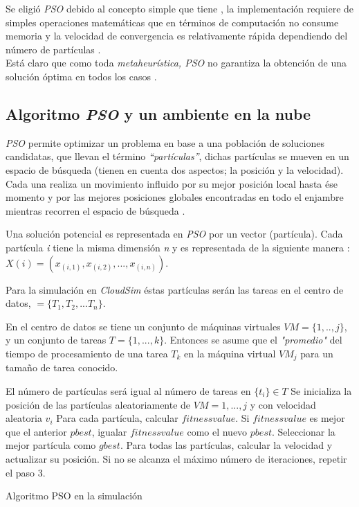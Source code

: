 \documentclass[jou,apacite]{apa6}
\begin{document}
Se eligió  \textit{PSO} debido al concepto simple que tiene \cite{poli2007},  la implementación requiere de simples operaciones matemáticas que en términos de computación no consume memoria  y la velocidad de convergencia es relativamente rápida dependiendo del número de partículas \cite{eberhart1995}.\\ 
Está claro que como toda \textit{metaheurística, PSO} no garantiza la obtención de una solución óptima en todos los casos \cite{osman2012}.

\subsection{Algoritmo \textit{PSO} y un ambiente en la nube}
\textit{PSO} permite optimizar un problema en base a una población de soluciones candidatas, que llevan el término \textit{“partículas”}, dichas partículas se mueven en un espacio de búsqueda (tienen en cuenta dos aspectos; la posición y la velocidad). Cada una realiza un movimiento influido por su mejor posición local hasta ése momento y por las mejores posiciones globales encontradas en todo el enjambre mientras recorren el espacio de búsqueda \cite{poli2007}.

Una solución potencial es representada en \textit{PSO} por un vector (partícula). Cada partícula \textit{i} tiene la misma dimensión \textit{n} y es representada de la siguiente manera \cite{pandey2010}: $X(i) = (x_{(i,1)},x_{(i,2)},...,x_{(i,n)})  $.

Para la simulación en \textit{CloudSim} éstas partículas serán las tareas en el centro de datos, $ = \{T_1 , T_2 , ... T_n\}  $.


En el centro de datos se tiene un conjunto de máquinas virtuales $VM = \{1,..,j\}$, y un conjunto de tareas $T = \{1,...,k\}$. Entonces se asume que el \textit{"promedio"} del tiempo de procesamiento de una tarea $T_k$ en la máquina virtual $VM_j$ para un tamaño de tarea conocido.
\newpage
\begin{algorithm} 
	\begin{algorithmic}[1]
		\State El número de partículas será igual al número de tareas en $ \{ t_i \} \in T $
		\State Se inicializa la posición de las partículas aleatoriamente de $VM = 1,...,j $ y con velocidad aleatoria $v_i$
		\State Para cada partícula, calcular $fitness value$.
		\State Si $fitness value$ es mejor que el anterior $pbest$, igualar $fitness value$ como el nuevo $pbest$.
		\State Seleccionar la mejor partícula como $gbest$.
		\State Para todas las partículas, calcular la velocidad y actualizar su posición.
		\State Si no se alcanza el máximo número de iteraciones, repetir el paso 3.
		
	\end{algorithmic} 
	\caption{Algoritmo PSO en la simulación}
	\label{alg:PSO}
\end{algorithm}
\end{document}
